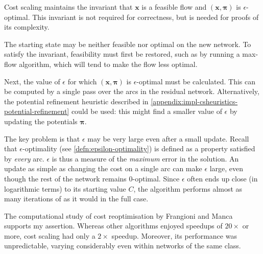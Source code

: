Cost scaling maintains the invariant that $\mathbf{x}$ is a feasible flow and $\left(\mathbf{x},\boldsymbol{\pi}\right)$ is $\epsilon$-optimal. This invariant is not required for correctness, but is needed for proofs of its complexity.

The starting state may be neither feasible nor optimal on the new network. To satisfy the invariant, feasibility must first be restored, such as by running a max-flow algorithm\footnotemark, which will tend to make the flow less optimal.

Next, the value of $\epsilon$ for which $\left(\mathbf{x},\boldsymbol{\pi}\right)$ is $\epsilon$-optimal must be calculated. This can be computed by a single pass over the arcs in the residual network. Alternatively, the potential refinement heuristic described in \cref{appendix:impl-csheuristics-potential-refinement} could be used: this might find a smaller value of $\epsilon$ by updating the potentials $\boldsymbol{\pi}$.

The key problem is that $\epsilon$ may be very large even after a small update. Recall that $\epsilon$-optimality (see \cref{defn:epsilon-optimality}) is defined as a property satisfied by \emph{every} arc. $\epsilon$ is thus a measure of the \emph{maximum} error in the solution. An update as simple as changing the cost on a single arc can make $\epsilon$ large, even though the rest of the network remains $0$-optimal. Since $\epsilon$ often ends up close (in logarithmic terms) to its starting value $C$, the algorithm performs almost as many iterations of  as it would in the full case.

The computational study of cost reoptimisation by Frangioni and Manca~\cite{Frangioni:2006} supports my assertion. Whereas other algorithms enjoyed speedups of $20\times$ or more, cost scaling had only a $2\times$ speedup. Moreover, its performance was unpredictable, varying considerably even within networks of the same class.

